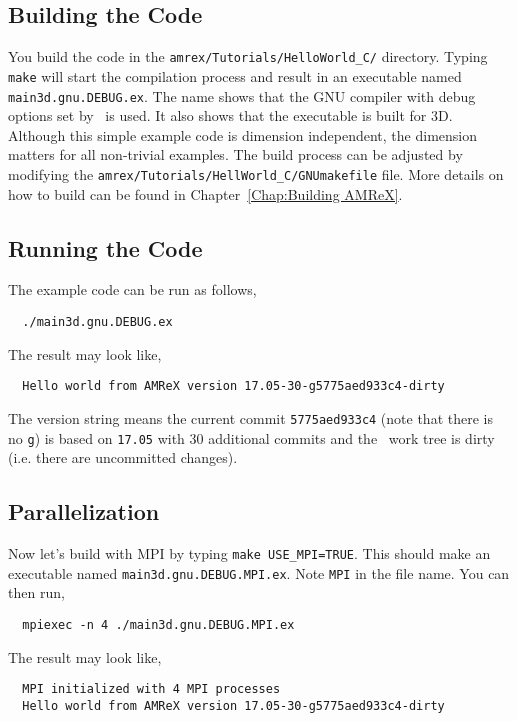 \subsection{Building the Code}

You build the code in the {\tt amrex/Tutorials/HelloWorld\_C/}
directory.  Typing {\tt make} will start the compilation process and
result in an executable named {\tt main3d.gnu.DEBUG.ex}.  The name
shows that the GNU compiler with debug options set by \amrex\ is used.
It also shows that the executable is built for 3D.  Although this
simple example code is dimension independent, the dimension matters
for all non-trivial examples.  The build process can be adjusted by
modifying the {\tt amrex/Tutorials/HellWorld\_C/GNUmakefile} file.
More details on how to build \amrex can be found in
Chapter~\ref{Chap:Building AMReX}.

\subsection{Running the Code}

The example code can be run as follows,
\begin{verbatim}
  ./main3d.gnu.DEBUG.ex
\end{verbatim}
The result may look like,
\begin{verbatim}
  Hello world from AMReX version 17.05-30-g5775aed933c4-dirty
\end{verbatim}
The version string means the current commit {\tt 5775aed933c4} (note
that there is no {\tt g}) is based on {\tt 17.05} with 30 additional
commits and the \amrex\ work tree is dirty (i.e. there are uncommitted
changes).

\subsection{Parallelization}

Now let's build with MPI by typing {\tt make USE\_MPI=TRUE}.  This
should make an executable named {\tt main3d.gnu.DEBUG.MPI.ex}.  Note
{\tt MPI} in the file name.  You can then run,
\begin{verbatim}
  mpiexec -n 4 ./main3d.gnu.DEBUG.MPI.ex
\end{verbatim}
The result may look like,
\begin{verbatim}
  MPI initialized with 4 MPI processes
  Hello world from AMReX version 17.05-30-g5775aed933c4-dirty
\end{verbatim}

